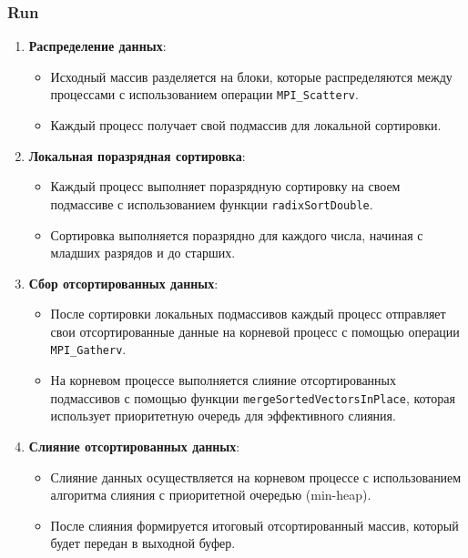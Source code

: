 \documentclass[12pt]{article}
\begin{document}
\subsubsection*{Run}

\begin{enumerate}
    \item \textbf{Распределение данных}:
    \begin{itemize}
        \item Исходный массив разделяется на блоки, которые распределяются между процессами с использованием операции \texttt{MPI\_Scatterv}.
        \item Каждый процесс получает свой подмассив для локальной сортировки.
    \end{itemize}

    \item \textbf{Локальная поразрядная сортировка}:
    \begin{itemize}
        \item Каждый процесс выполняет поразрядную сортировку на своем подмассиве с использованием функции \texttt{radixSortDouble}.
        \item Сортировка выполняется поразрядно для каждого числа, начиная с младших разрядов и до старших.
    \end{itemize}

    \item \textbf{Сбор отсортированных данных}:
    \begin{itemize}
        \item После сортировки локальных подмассивов каждый процесс отправляет свои отсортированные данные на корневой процесс с помощью операции \texttt{MPI\_Gatherv}.
        \item На корневом процессе выполняется слияние отсортированных подмассивов с помощью функции \texttt{mergeSortedVectorsInPlace}, которая использует приоритетную очередь для эффективного слияния.
    \end{itemize}

    \item \textbf{Слияние отсортированных данных}:
    \begin{itemize}
        \item Слияние данных осуществляется на корневом процессе с использованием алгоритма слияния с приоритетной очередью (min-heap).
        \item После слияния формируется итоговый отсортированный массив, который будет передан в выходной буфер.
    \end{itemize}
\end{enumerate}
\end{document}
